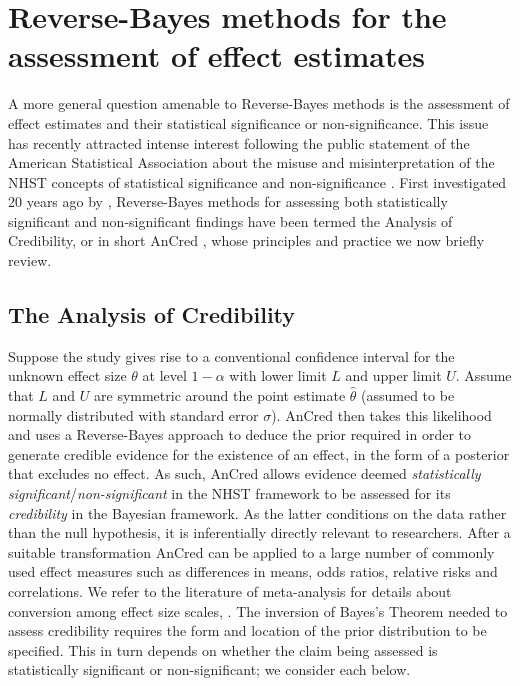 \section{Reverse-Bayes methods for the assessment of effect estimates}\label{sec4:effects}
A more general question amenable to Reverse-Bayes methods is the assessment of
effect estimates and their statistical significance or non-significance. This
issue has recently attracted intense interest following the public statement of
the American Statistical Association about the misuse and misinterpretation of
the NHST concepts of statistical significance and non-significance
\citep{Wasserstein2016}. First investigated 20 years ago by
\citet{Matthews2001a, Matthews2001b}, Reverse-Bayes methods for assessing both
statistically significant and non-significant findings have been termed the
Analysis of Credibility, or in short AnCred \citep{Matthews2018}, whose
principles and practice we now briefly review.

\subsection{The Analysis of Credibility}
\label{sec4:AnCred}
Suppose the study gives rise to a conventional confidence interval for the
unknown effect size $\theta$ at level $1 - \alpha$ with lower limit $L$ and
upper limit $U$. Assume that $L$ and $U$ are symmetric around the point estimate
$\hat \theta$ (assumed to be normally distributed with standard error $\sigma$).
AnCred then takes this likelihood and uses a Reverse-Bayes approach to deduce
the prior required in order to generate credible evidence for the existence of
an effect, in the form of a posterior that excludes no effect. As such, AnCred
allows evidence deemed \emph{statistically significant}/\emph{non-significant}
in the NHST framework to be assessed for its \emph{credibility} in the Bayesian
framework. As the latter conditions on the data rather than the null hypothesis,
it is inferentially directly relevant to researchers. After a suitable
transformation AnCred can be applied to a large number of commonly used effect
measures such as differences in means, odds ratios, relative risks and
correlations. We refer to the literature of meta-analysis for details about
conversion among effect size scales, \eg{} \citet[chapter 11.6]{Cooper2019}. The
inversion of Bayes's Theorem needed to assess credibility requires the form and
location of the prior distribution to be specified. This in turn depends on
whether the claim being assessed is statistically significant or
non-significant; we consider each below.


